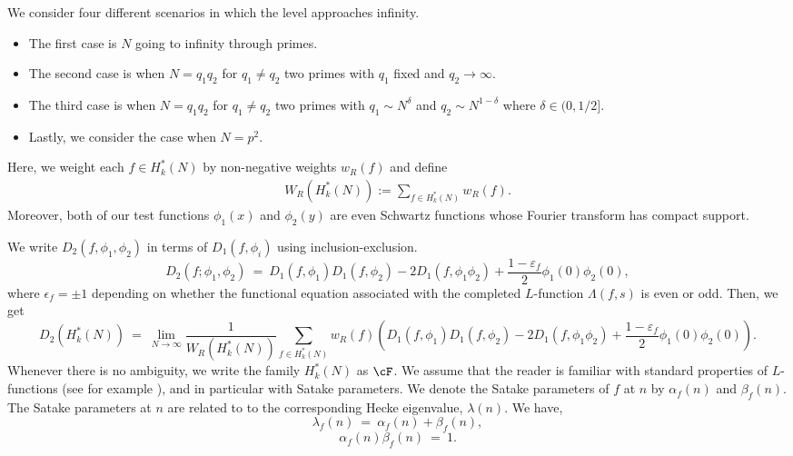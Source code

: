 \documentclass[11pt, reqno]{amsart}
\theoremstyle{definition}
\theoremstyle{remark}
\numberwithin{equation}{section}
\begin{document}
We consider four different scenarios in which the level approaches infinity. \begin{itemize}
    \item The first case is $N$ going to infinity through primes. 
    \item The second case is when $N=q_1q_2$ for $q_1 \neq q_2$ two primes with $q_1$ fixed and $q_2 \to \infty.$
    \item The third case is when $N=q_1q_2$ for $q_1 \neq q_2$ two primes with $q_1 \sim N^{\delta}$ and $q_2 \sim N^{1-\delta}$ where $\delta \in (0,1/2].$
    \item Lastly, we consider the case when $N=p^2$.
\end{itemize}  Here, we weight each $f\in H_k^*(N)$ by non-negative weights $w_R(f)$ and define
\begin{align}
    W_R(H_k^*(N)):= \sum_{f\in H_k^*(N)}w_R(f).
\end{align} Moreover, both of our test functions $\phi_1(x)$ and $\phi_2(y)$ are even Schwartz functions whose Fourier transform has compact support.

We write $D_2(f,\phi_1,\phi_2)$ in terms of $D_1(f,\phi_i)$ using inclusion-exclusion.
\begin{equation}\label{eq:2lvl_break_down}
    D_2(f; \phi_1, \phi_2)\ =\ D_1(f, \phi_1)D_1(f, \phi_2)-2D_1(f, \phi_1\phi_2)+\frac{1-\varepsilon_f}{2}\phi_1(0)\phi_2(0),
\end{equation} where $\epsilon_f = \pm1$ depending on whether the functional equation associated with the completed $L$-function $\Lambda(f,s)$ is even or odd. Then, we get
\small\begin{equation}
    D_2\left(H_k^*(N)\right) \ =\ \lim_{N\to \infty } \frac{1}{W_R(H_k^*(N))}\sum_{f\in H_k^*(N)} w_R(f)\left(D_1(f, \phi_1)D_1(f, \phi_2)-2D_1(f, \phi_1\phi_2)+\frac{1-\varepsilon_f}{2}\phi_1(0)\phi_2(0)\right).
\end{equation}\normalsize
Whenever there is no ambiguity, we write the family $H_k^*(N)$ as $\cF$. We assume that the reader is familiar with standard properties of $L$-functions (see for example \cite{iwaniec-kwalski2004analytic}), and in particular with Satake parameters. We denote the Satake parameters of $f$ at $n$ by $\alpha_f(n)$ and $\beta_f(n)$. The Satake parameters at $n$ are related to to the corresponding Hecke eigenvalue, $\lambda(n)$. We have,
\begin{equation}
    \lambda_f(n) \ = \ \alpha_f(n) + \beta_f(n), \end{equation}\begin{equation}
        \alpha_f(n) \beta_f(n) \ =\ 1.
\end{equation}
\end{document}
